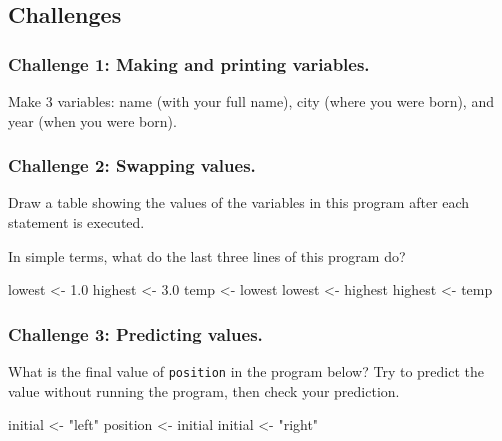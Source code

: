 \documentclass[]{book}
\newenvironment{Shaded}{\begin{snugshade}}{\end{snugshade}}
\newcommand{\FloatTok}[1]{\textcolor[rgb]{0.00,0.00,0.81}{#1}}
\newcommand{\StringTok}[1]{\textcolor[rgb]{0.31,0.60,0.02}{#1}}
\newcommand{\NormalTok}[1]{#1}
\begin{document}
\subsection{Challenges}\label{challenges-1}

\subsubsection*{Challenge 1: Making and printing
variables.}\label{challenge-1-making-and-printing-variables.}

Make 3 variables: name (with your full name), city (where you were
born), and year (when you were born).

\subsubsection*{Challenge 2: Swapping
values.}\label{challenge-2-swapping-values.}

Draw a table showing the values of the variables in this program after
each statement is executed.

In simple terms, what do the last three lines of this program do?

\begin{Shaded}
\begin{Highlighting}[]
\NormalTok{lowest <-}\StringTok{ }\FloatTok{1.0}
\NormalTok{highest <-}\StringTok{ }\FloatTok{3.0}
\NormalTok{temp <-}\StringTok{ }\NormalTok{lowest}
\NormalTok{lowest <-}\StringTok{ }\NormalTok{highest}
\NormalTok{highest <-}\StringTok{ }\NormalTok{temp}
\end{Highlighting}
\end{Shaded}

\subsubsection*{Challenge 3: Predicting
values.}\label{challenge-3-predicting-values.}

What is the final value of \texttt{position} in the program below? Try
to predict the value without running the program, then check your
prediction.

\begin{Shaded}
\begin{Highlighting}[]
\NormalTok{initial <-}\StringTok{ "left"}
\NormalTok{position <-}\StringTok{ }\NormalTok{initial}
\NormalTok{initial <-}\StringTok{ "right"}
\end{Highlighting}
\end{Shaded}
\end{document}
